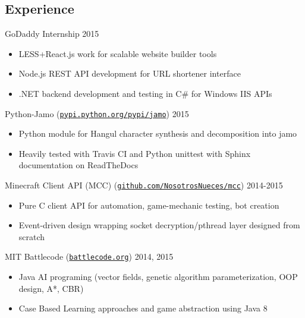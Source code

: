 \documentclass[line,margin]{res}
\begin{document}
\begin{resume}
\vspace{-8pt}
\section{Experience} 
\vspace{12pt}
GoDaddy Internship
\hfill  2015
    \begin{itemize} \itemsep -2pt %
    \item LESS+React.js work for scalable website builder tools
    \item Node.js REST API development for URL shortener interface
    \item .NET backend development and testing in C\# for Windows IIS APIs
    \end{itemize}

\vspace{-6pt}
Python-Jamo
(\href{https://pypi.python.org/pypi/jamo}{\texttt{pypi.python.org/pypi/jamo}})
\hfill  2015
    \begin{itemize} \itemsep -2pt %
    \item Python module for Hangul character synthesis and decomposition into jamo
    \item Heavily tested with Travis CI and Python unittest with Sphinx documentation on ReadTheDocs
    \end{itemize}

\vspace{-6pt}
Minecraft Client API (MCC)
(\href{https://www.github.com/NosotrosNueces/mcc}{\texttt{github.com/NosotrosNueces/mcc}})
\hfill  2014-2015
    \begin{itemize} \itemsep -2pt %
    \item Pure C client API for automation, game-mechanic testing, bot creation
    \item Event-driven design wrapping socket decryption/pthread layer designed from scratch
    \end{itemize}

\vspace{-6pt}
MIT Battlecode
(\href{http://www.battlecode.org/}{\texttt{battlecode.org}})
\hfill  2014, 2015
    \begin{itemize} \itemsep -2pt %
    \item Java AI programing (vector fields, genetic algorithm parameterization, OOP design, A*, CBR)
    \item Case Based Learning approaches and game abstraction using Java 8
    \end{itemize}


\end{resume}
\end{document}
